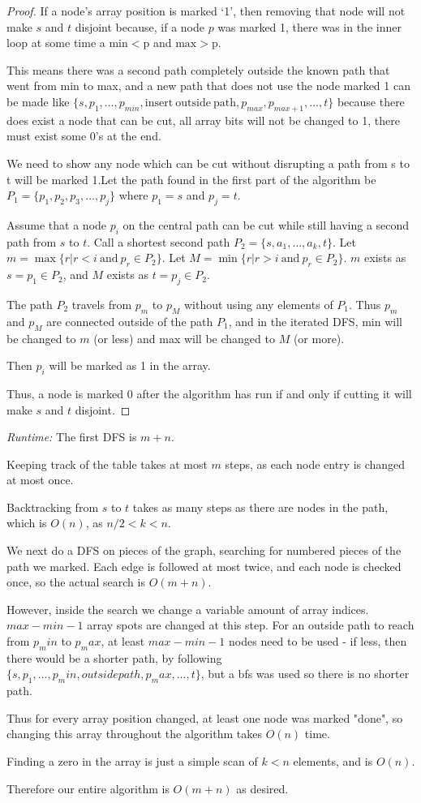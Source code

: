 \documentclass{article}
\begin{document}
\begin{proof}If a node's array position is marked `1', then removing that node will not make $s$ and $t$ disjoint because, if a node $p$ was marked 1, there was in the inner loop at some time a $\mathrm{min}<\mathrm{p}$  and $\mathrm{max}>\mathrm{p}$.

This means there was a second path completely outside the known path that went from min to max, and a new path that does not use the node marked 1 can be made like $\{s, p_1,\dots, p_{min}, \mathrm{insert\ outside\ path}, p_{max}, p_{max+1},..., t\}$
because there does exist a node that can be cut, all array bits will not be changed to 1, there must exist some 0's at the end.

 We need to show any node which can be cut without disrupting a path from s to t will be marked 1.Let the path found in the first part of the algorithm be $P_1 = \{p_1, p_2, p_3,\dots, p_j\}$ where $p_1 = s$ and $p_j = t$.

Assume that a node $p_i$ on the central path can be cut while still having a second path from $s$ to $t$. Call a shortest second path $P_2 = \{s, a_1,\dots, a_k, t\}$. Let $m = \max{\{r | r<i \mathrm{\ and\ } p_r \in P_2\}}$. Let $M = \min{\{r | r>i\mathrm{\ and\ }p_r \in P_2\}}$. $m$ exists as $s=p_1 \in P_2$, and $M$ exists as $t=p_j \in P_2$.

The path  $P_2$ travels from $p_m$ to $p_M$ without using any elements of $P_1$. Thus $p_m$ and $p_M$ are connected outside of the path $P_1$, and in the iterated DFS, min will be changed to $m$ (or less) and max will be changed to $M$ (or more).

Then $p_i$ will be marked as 1 in the array.

Thus, a node is marked 0 after the algorithm has run if and only if cutting it will make $s$ and $t$ disjoint.
\end{proof}


\emph{Runtime:}
The first DFS is $m+n$.

Keeping track of the table takes at most $m$ steps, as each node entry is changed at most once.

Backtracking from $s$ to $t$ takes as many steps as there are nodes in the path, which is $O(n)$, as $n/2 < k < n$.

We next do a DFS on pieces of the graph, searching for numbered pieces of the path we marked. Each edge is followed at most twice, and each node is checked once, so the actual search is $O(m+n)$.

However, inside the search we change a variable amount of array indices. $max-min-1$ array spots are changed at this step.  For an outside path to reach from $p_min$ to $p_max$, at least $max-min-1$ nodes need to be used - if less, then there would be a shorter path, by following $\{s, p_1,..., p_min, outside path, p_max,..., t\}$, but a bfs was used so there is no shorter path.

Thus for every array position changed, at least one node was marked "done", so changing this array throughout the algorithm takes $O(n)$ time.

Finding a zero in the array is just a simple scan of $k<n$ elements, and is $O(n)$.

Therefore our entire algorithm is $O(m+n)$ as desired.
\end{document}
